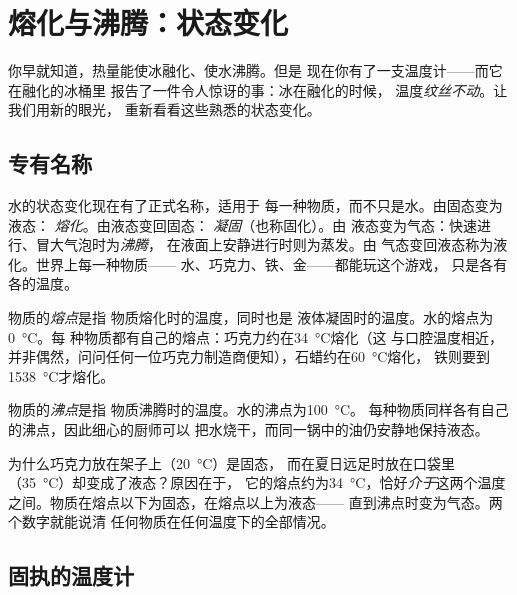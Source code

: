 \chapter{熔化与沸腾：状态变化}\label{ch:g4:changes-of-state}

你早就知道，热量能使冰融化、使水沸腾。但是
现在你有了一支温度计——而它在融化的冰桶里
报告了一件令人惊讶的事：冰在融化的时候，
温度\emph{纹丝不动}。让我们用新的眼光，
重新看看这些熟悉的状态变化。

\section{专有名称}

水的状态变化现在有了正式名称，适用于
每一种物质，而不只是水。由固态变为液态：
\emph{熔化}。由液态变回固态：
\emph{凝固}（也称固化）。由
液态变为气态：快速进行、冒大气泡时为\emph{沸腾}，
在液面上安静进行时则为蒸发。由
气态变回液态称为液化。世界上每一种物质——
水、巧克力、铁、金——都能玩这个游戏，
只是各有各的温度。

\begin{definition}[熔点]\label{def:g4:changes-of-state:melting-point}
物质的\emph{熔点}是指
物质熔化时的温度，同时也是
液体凝固时的温度。水的熔点为\qty{0}{\celsius}。每
种物质都有自己的熔点：巧克力约在\qty{34}{\celsius}熔化（这
与口腔温度相近，并非偶然，问问任何一位巧克力制造商便知），石蜡约在\qty{60}{\celsius}熔化，
铁则要到\qty{1538}{\celsius}才熔化。
\end{definition}

\begin{definition}[沸点]\label{def:g4:changes-of-state:boiling-point}
物质的\emph{沸点}是指
物质沸腾时的温度。水的沸点为\qty{100}{\celsius}。
每种物质同样各有自己的沸点，因此细心的厨师可以
把水烧干，而同一锅中的油仍安静地保持液态。
\end{definition}

\begin{example}[用两个数读懂世界]\label{ex:g4:changes-of-state:reading}
为什么巧克力放在架子上（\qty{20}{\celsius}）是固态，
而在夏日远足时放在口袋里（\qty{35}{\celsius}）却变成了液态？原因在于，
它的熔点约为\qty{34}{\celsius}，恰好\emph{介于}这两个温度
之间。物质在熔点以下为固态，在熔点以上为液态——
直到沸点时变为气态。两个数字就能说清
任何物质在任何温度下的全部情况。
\end{example}

\section{固执的温度计}

